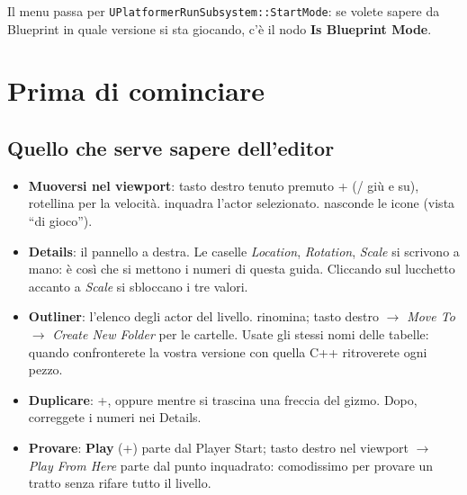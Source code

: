\documentclass[a4paper,10pt]{article}
\newcommand{\nodo}[1]{\textsf{\textbf{#1}}}
\newcommand{\var}[1]{\texttt{#1}}
\newcommand{\tasto}[1]{\fbox{\footnotesize\textsf{#1}}}
\begin{document}
\begin{bpgraph}
\end{bpgraph}

Il menu passa per \var{UPlatformerRunSubsystem::StartMode}: se volete sapere da Blueprint in quale versione si sta giocando, c'è il nodo \nodo{Is Blueprint Mode}.

\section{Prima di cominciare}

\subsection{Quello che serve sapere dell'editor}

\begin{itemize}
  \item \textbf{Muoversi nel viewport}: tasto destro tenuto premuto + \tasto{W}\tasto{A}\tasto{S}\tasto{D} (\tasto{Q}/\tasto{E} giù e su), rotellina per la velocità. \tasto{F} inquadra l'actor selezionato. \tasto{G} nasconde le icone (vista ``di gioco'').
  \item \textbf{Details}: il pannello a destra. Le caselle \emph{Location}, \emph{Rotation}, \emph{Scale} si scrivono a mano: è così che si mettono i numeri di questa guida. Cliccando sul lucchetto accanto a \emph{Scale} si sbloccano i tre valori.
  \item \textbf{Outliner}: l'elenco degli actor del livello. \tasto{F2} rinomina; tasto destro $\rightarrow$ \emph{Move To} $\rightarrow$ \emph{Create New Folder} per le cartelle. Usate gli stessi nomi delle tabelle: quando confronterete la vostra versione con quella C++ ritroverete ogni pezzo.
  \item \textbf{Duplicare}: \tasto{Ctrl}+\tasto{D}, oppure \tasto{Alt} mentre si trascina una freccia del gizmo. Dopo, correggete i numeri nei Details.
  \item \textbf{Provare}: \nodo{Play} (\tasto{Alt}+\tasto{P}) parte dal Player Start; tasto destro nel viewport $\rightarrow$ \emph{Play From Here} parte dal punto inquadrato: comodissimo per provare un tratto senza rifare tutto il livello.
\end{itemize}
\end{document}
